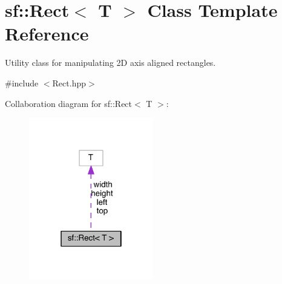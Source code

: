 \hypertarget{classsf_1_1_rect}{\section{sf\-:\-:Rect$<$ T $>$ Class Template Reference}
\label{classsf_1_1_rect}
}


Utility class for manipulating 2\-D axis aligned rectangles.  




{\ttfamily \#include $<$Rect.\-hpp$>$}



Collaboration diagram for sf\-:\-:Rect$<$ T $>$\-:
\nopagebreak
\begin{figure}[H]
\begin{center}
\leavevmode
\includegraphics[width=154pt]{classsf_1_1_rect__coll__graph}
\end{center}
\end{figure}
